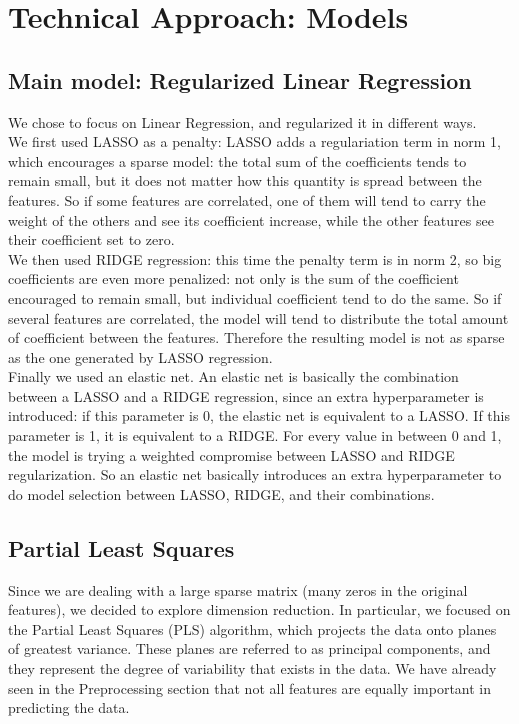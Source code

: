 \documentclass[11pt]{article}
\begin{document}
    
\section{Technical Approach: Models}
    \subsection{Main model: Regularized Linear Regression}
    We chose to focus on Linear Regression, and regularized it in different ways. \\
    We first used LASSO as a penalty: LASSO adds a regulariation term in norm 1, which encourages a sparse model: the total sum of the
    coefficients tends to remain small, but it does not matter how this quantity is spread between the features.
    So if some features are correlated, one of them will tend to carry the weight of the others and see its coefficient increase, while the 
    other features see their coefficient set to zero. \\
    We then used RIDGE regression: this time the penalty term is in norm 2, so big coefficients are even more penalized: not only is the sum
    of the coefficient encouraged to remain small, but individual coefficient tend to do the same. So if several features are
    correlated, the model will tend to distribute the total amount of coefficient between the features. Therefore the resulting model is not
    as sparse as the one generated by LASSO regression. \\
    Finally we used an elastic net. An elastic net is basically the combination between a LASSO and a RIDGE regression, since an extra
    hyperparameter is introduced: if this parameter is 0, the elastic net is equivalent to a LASSO. If this parameter is 1, it is equivalent
    to a RIDGE. For every value in between 0 and 1, the model is trying a weighted compromise between LASSO and RIDGE regularization.
    So an elastic net basically introduces an extra hyperparameter to do model selection between LASSO, RIDGE, and their combinations.
    
    \subsection{Partial Least Squares}
Since we are dealing with a large sparse matrix (many zeros in the original features), we decided to explore dimension reduction. In particular, we focused on the Partial Least Squares (PLS) algorithm, which projects the data onto planes of greatest variance. These planes are referred to as principal components, and they represent the degree of variability that exists in the data. We have already seen in the Preprocessing section that not all features are equally important in predicting the data.
\end{document}

